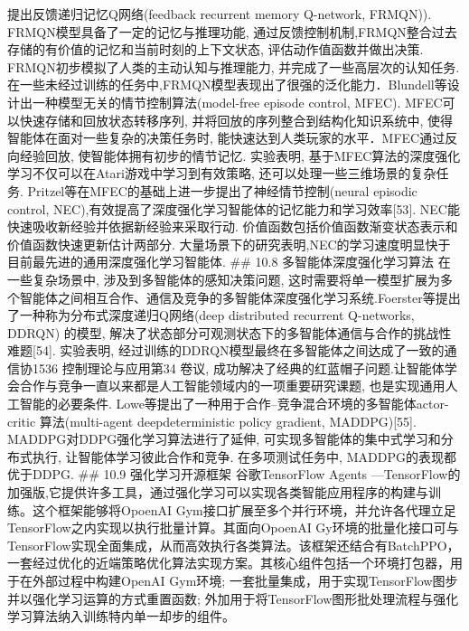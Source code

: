 提出反馈递归记忆Q网络(feedback recurrent memory Q-network, FRMQN)).
FRMQN模型具备了一定的记忆与推理功能,
通过反馈控制机制,FRMQN整合过去存储的有价值的记忆和当前时刻的上下文状态,
评估动作值函数并做出决策. FRMQN初步模拟了人类的主动认知与推理能力,
并完成了一些高层次的认知任务.
在一些未经过训练的任务中,FRMQN模型表现出了很强的泛化能力．Blundell等设计出一种模型无关的情节控制算法(model-free
episode control, MFEC). MFEC可以快速存储和回放状态转移序列,
并将回放的序列整合到结构化知识系统中,
使得智能体在面对一些复杂的决策任务时,
能快速达到人类玩家的水平．MFEC通过反向经验回放,
使智能体拥有初步的情节记忆. 实验表明,
基于MFEC算法的深度强化学习不仅可以在Atari游戏中学习到有效策略,
还可以处理一些三维场景的复杂任务.
Pritzel等在MFEC的基础上进一步提出了神经情节控制(neural episodic control,
NEC),有效提高了深度强化学习智能体的记忆能力和学习效率{[}53{]}.
NEC能快速吸收新经验并依据新经验来采取行动.
价值函数包括价值函数渐变状态表示和价值函数快速更新估计两部分.
大量场景下的研究表明,NEC的学习速度明显快于目前最先进的通用深度强化学习智能体.
\#\# 10.8 多智能体深度强化学习算法 在一些复杂场景中,
涉及到多智能体的感知决策问题,
这时需要将单一模型扩展为多个智能体之间相互合作、通信及竞争的多智能体深度强化学习系统.Foerster等提出了一种称为分布式深度递归Q网络(deep
distributed recurrent Q-networks, DDRQN) 的模型,
解决了状态部分可观测状态下的多智能体通信与合作的挑战性难题{[}54{]}.
实验表明, 经过训练的DDRQN模型最终在多智能体之间达成了一致的通信协1536
控制理论与应用第34 卷议,
成功解决了经典的红蓝帽子问题.让智能体学会合作与竞争一直以来都是人工智能领域内的一项重要研究课题,
也是实现通用人工智能的必要条件.
Lowe等提出了一种用于合作--竞争混合环境的多智能体actor-critic
算法(multi-agent deepdeterministic policy gradient, MADDPG){[}55{]}.
MADDPG对DDPG强化学习算法进行了延伸,
可实现多智能体的集中式学习和分布式执行, 让智能体学习彼此合作和竞争.
在多项测试任务中, MADDPG的表现都优于DDPG. \#\# 10.9 强化学习开源框架
谷歌TensorFlow Agents
---TensorFlow的加强版,它提供许多工具，通过强化学习可以实现各类智能应用程序的构建与训练。这个框架能够将OpoenAI
Gym接口扩展至多个并行环境，并允许各代理立足TensorFlow之内实现以执行批量计算。其面向OpoenAI
Gy环境的批量化接口可与TensorFlow实现全面集成，从而高效执行各类算法。该框架还结合有BatchPPO，一套经过优化的近端策略优化算法实现方案。其核心组件包括一个环境打包器，用于在外部过程中构建OpenAI
Gym环境;
一套批量集成，用于实现TensorFlow图步并以强化学习运算的方式重置函数;
外加用于将TensorFlow图形批处理流程与强化学习算法纳入训练特内单一却步的组件。

